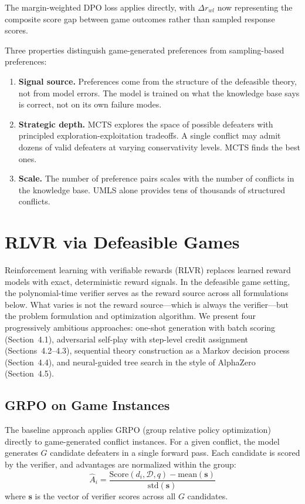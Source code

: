 \documentclass{article}
\newcommand{\D}{\mathcal{D}}
\newcommand{\Score}{\mathrm{Score}}
\begin{document}
The margin-weighted DPO loss applies directly, with $\Delta r_{wl}$ now representing the composite score gap between game outcomes rather than sampled response scores.

Three properties distinguish game-generated preferences from sampling-based preferences:

\begin{enumerate}[nosep]
    \item \textbf{Signal source.} Preferences come from the structure of the defeasible theory, not from model errors. The model is trained on what the knowledge base says is correct, not on its own failure modes.
    \item \textbf{Strategic depth.} MCTS explores the space of possible defeaters with principled exploration-exploitation tradeoffs. A single conflict may admit dozens of valid defeaters at varying conservativity levels. MCTS finds the best ones.
    \item \textbf{Scale.} The number of preference pairs scales with the number of conflicts in the knowledge base. UMLS alone provides tens of thousands of structured conflicts.
\end{enumerate}

\section{RLVR via Defeasible Games}

Reinforcement learning with verifiable rewards (RLVR) replaces learned reward models with exact, deterministic reward signals. In the defeasible game setting, the polynomial-time verifier serves as the reward source across all formulations below. What varies is not the reward source---which is always the verifier---but the problem formulation and optimization algorithm. We present four progressively ambitious approaches: one-shot generation with batch scoring (Section~4.1), adversarial self-play with step-level credit assignment (Sections~4.2--4.3), sequential theory construction as a Markov decision process (Section~4.4), and neural-guided tree search in the style of AlphaZero (Section~4.5).

\subsection{GRPO on Game Instances}

The baseline approach applies GRPO (group relative policy optimization) directly to game-generated conflict instances. For a given conflict, the model generates $G$ candidate defeaters in a single forward pass. Each candidate is scored by the verifier, and advantages are normalized within the group:
\[
    \hat{A}_i = \frac{\Score(d_i, \D, q) - \mathrm{mean}(\mathbf{s})}{\mathrm{std}(\mathbf{s})}
\]
where $\mathbf{s}$ is the vector of verifier scores across all $G$ candidates.
\end{document}
